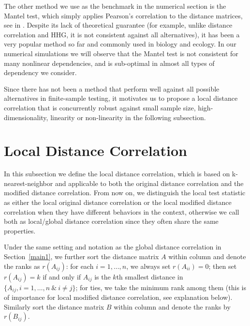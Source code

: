 \documentclass[11pt]{article}
\begin{document}
The other method we use as the benchmark in the numerical section is the Mantel test, which simply applies Pearson's correlation to the distance matrices, see in \cite{Mantel1967}. Despite its lack of theoretical guarantee (for example, unlike distance correlation and HHG, it is not consistent against all alternatives), it has been a very popular method so far and commonly used in biology and ecology. In our numerical simulations we will observe that the Mantel test is not consistent for many nonlinear dependencies, and is sub-optimal in almost all types of dependency we consider.

Since there has not been a method that perform well against all possible alternatives in finite-sample testing, it motivates us to propose a local distance correlation that is concurrently robust against small sample size, high-dimensionality, linearity or non-linearity in the following subsection.

\section{Local Distance Correlation}
\label{main2}
In this subsection we define the local distance correlation, which is based on k-nearest-neighbor and applicable to both the original distance correlation and the modified distance correlation. From now on, we distinguish the local test statistic as either the local original distance correlation or the local modified distance correlation when they have different behaviors in the context, otherwise we call both as local/global distance correlation since they often share the same properties.

Under the same setting and notation as the global distance correlation in Section~\ref{main1}, we further sort the distance matrix $A$ within column and denote the ranks as $r(A_{ij})$: for each $i=1, \ldots, n$, we always set $r(A_{ii})=0$; then set $r(A_{ij})=k$ if and only if $A_{ij}$ is the $k$th smallest distance in $\{A_{ij}, i=1,\ldots,n\ \& \ i \neq j\}$; for ties, we take the minimum rank among them (this is of importance for local modified distance correlation, see explanation below). Similarly sort the distance matrix $B$ within column and denote the ranks by $r(B_{ij})$.
\end{document}
